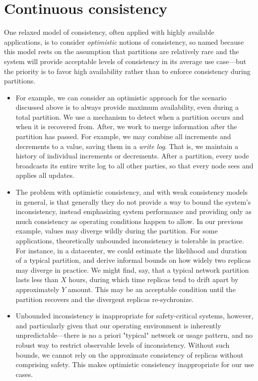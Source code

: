 \section{Continuous consistency}
\label{sec:contcons}

One relaxed model of consistency, often applied with highly available
applications, is to consider \emph{optimistic} notions of consistency,
so named because this model rests on the assumption that partitions
are relatively rare and the system will provide acceptable levels of
consistency in its average use case---but the priority is to favor
high availability rather than to enforce consistency during
partitions.

\begin{itemize}
  \item For example, we can consider an optimistic approach for the
    scenario discussed above is to always provide maximum
    availability, even during a total partition. We use a mechanism to
    detect when a partition occurs and when it is recovered
    from. After, we work to merge information after the partition has
    passed. For example, we may combine all increments and decrements
    to a value, saving them in a \emph{write log}. That is, we
    maintain a history of individual increments or decrements. After a
    partition, every node broadcasts its entire write log to all other
    parties, so that every node sees and applies all updates.

  \item The problem with optimistic consistency, and with weak
    consistency models in general, is that generally they do not
    provide a way to bound the system's inconsistency, instead
    emphasizing system performance and providing only as much
    consistency as operating conditions happen to allow. In our
    previous example, values may diverge wildly during the
    partition. For some applications, theoretically unbounded
    inconsistency is tolerable in practice. For instance, in a
    datacenter, we could estimate the likelihood and duration of a
    typical partition, and derive informal bounds on how widely two
    replicas may diverge in practice. We might find, say, that a
    typical network partition lasts less than $X$ hours, during which
    time replicas tend to drift apart by approximately $Y$
    amount. This may be an acceptable condition until the partition
    recovers and the divergent replicas re-sychronize.

  \item Unbounded inconsistency is inappropriate for safety-critical
    systems, however, and particularly given that our operating
    environment is inherently unpredictable---there is no a priori
    "typical" network or usage pattern, and no robust way to restrict
    observable levels of inconsistency. Without such bounds, we cannot
    rely on the approximate consistency of replicas without comprising
    safety. This makes optimistic consistency inappropriate for our
    use cases.
\end{itemize}

